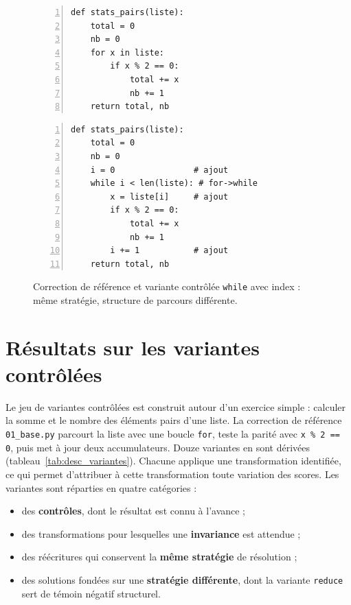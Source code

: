 \documentclass[12pt,a4paper,oneside]{report}
\begin{document}
\begin{figure}[htbp]
\centering
\begin{minipage}[t]{0.47\textwidth}
\begin{lstlisting}[style=pyncst, numbers=left, numberstyle=\tiny\color{graycol},
  title={\small\texttt{01\_base.py} (référence)}]
def stats_pairs(liste):
    total = 0
    nb = 0
    for x in liste:
        if x % 2 == 0:
            total += x
            nb += 1
    return total, nb
\end{lstlisting}
\end{minipage}%
\hfill
\begin{minipage}[t]{0.47\textwidth}
\begin{lstlisting}[style=pyncst, numbers=left, numberstyle=\tiny\color{graycol},
  title={\small\texttt{9\_while\_index.py} (variante)}]
def stats_pairs(liste):
    total = 0
    nb = 0
    i = 0                # ajout
    while i < len(liste): # for->while
        x = liste[i]     # ajout
        if x % 2 == 0:
            total += x
            nb += 1
        i += 1           # ajout
    return total, nb
\end{lstlisting}
\end{minipage}
\caption{Correction de référence et variante contrôlée \og \texttt{while}
avec index \fg{} : même stratégie, structure de parcours différente.}
\label{fig:exemple_variante}
\end{figure}



\section{Résultats sur les variantes contrôlées}
\label{sec:res_variantes}

Le jeu de variantes contrôlées est construit autour d'un exercice simple :
calculer la somme et le nombre des éléments pairs d'une liste. La correction
de référence \texttt{01\_base.py} parcourt la liste avec une boucle
\texttt{for}, teste la parité avec \texttt{x \% 2 == 0}, puis met à jour deux
accumulateurs. Douze variantes en sont dérivées
(tableau~\ref{tab:desc_variantes}). Chacune applique une transformation
identifiée, ce qui permet d'attribuer à cette transformation toute variation
des scores. Les variantes sont réparties en quatre catégories :
\begin{itemize}
  \item des \textbf{contrôles}, dont le résultat est connu à l'avance ;
  \item des transformations pour lesquelles une \textbf{invariance} est
        attendue ;
  \item des réécritures qui conservent la \textbf{même stratégie} de
        résolution ;
  \item des solutions fondées sur une \textbf{stratégie différente}, dont la
        variante \texttt{reduce} sert de témoin négatif structurel.
\end{itemize}
\end{document}

